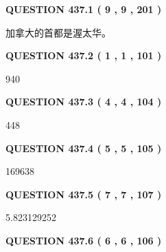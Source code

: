 \documentclass{ctexart}
\begin{document}
   
  
\vspace{0.2in}
  
{\textbf{\Large{QUESTION
437.1 
 ( 9 , 9 , 201 )
}}}
  
  
 
 
\noindent{}
 
 
加拿大的首都是渥太华。
 
 
 
 
  
\vspace{0.2in}
  
{\textbf{\Large{QUESTION
437.2 
 ( 1 , 1 , 101 )
}}}
  
  
 
 
\noindent{}

940
 
 
  
\vspace{0.2in}
  
{\textbf{\Large{QUESTION
437.3 
 ( 4 , 4 , 104 )
}}}
  
  
 
 
\noindent{}

448
 
 
  
\vspace{0.2in}
  
{\textbf{\Large{QUESTION
437.4 
 ( 5 , 5 , 105 )
}}}
  
  
 
 
\noindent{}

169638
 
 
  
\vspace{0.2in}
  
{\textbf{\Large{QUESTION
437.5 
 ( 7 , 7 , 107 )
}}}
  
  
 
 
\noindent{}

5.823129252
 
 
  
\vspace{0.2in}
  
{\textbf{\Large{QUESTION
437.6 
 ( 6 , 6 , 106 )
}}}
  
\end{document}
